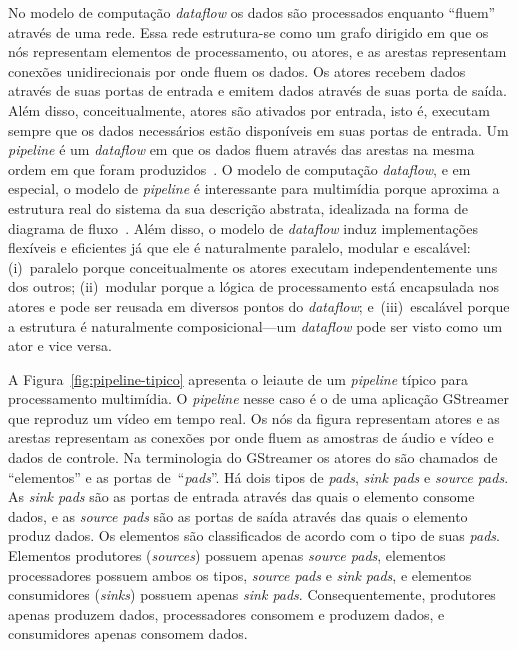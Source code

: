 \documentclass{SBCbookchapter}
\def\en#1{\foreignlanguage{english}{\emph{#1}}}
\begin{document}
No modelo de computação \en{dataflow} os dados são processados enquanto
``fluem'' através de uma rede.  Essa rede estrutura-se como um grafo
dirigido em que os nós representam elementos de processamento, ou atores, e
as arestas representam conexões unidirecionais por onde fluem os dados.  Os
atores recebem dados através de suas portas de entrada e emitem dados
através de suas porta de saída.  Além disso, conceitualmente, atores são
ativados por entrada, isto é, executam sempre que os dados necessários estão
disponíveis em suas portas de entrada.  Um \en{pipeline} é um \en{dataflow}
em que os dados fluem através das arestas na mesma ordem em que foram
produzidos~\cite{Kahn-G-1977,Lee-E-A-1995}.  O modelo de computação
\en{dataflow}, e em especial, o modelo de \en{pipeline} é interessante para
multimídia porque aproxima a estrutura real do sistema da sua descrição
abstrata, idealizada na forma de diagrama de fluxo~\cite{Yviquel-H-2014}.
Além disso, o modelo de \en{dataflow} induz implementações flexíveis e
eficientes já que ele é naturalmente paralelo, modular e escalável:
(i)~paralelo porque conceitualmente os atores executam independentemente uns
dos outros; (ii)~modular porque a lógica de processamento está encapsulada
nos atores e pode ser reusada em diversos pontos do \en{dataflow};
e~(iii)~escalável porque a estrutura é naturalmente composicional---um
\en{dataflow} pode ser visto como um ator e vice versa.

A Figura~\ref{fig:pipeline-tipico} apresenta o leiaute de um \en{pipeline}
típico para processamento multimídia.  O \en{pipeline} nesse caso é o de uma
aplicação GStreamer que reproduz um vídeo em tempo real.  Os nós da figura
representam atores e as arestas representam as conexões por onde fluem as
amostras de áudio e vídeo e dados de controle.  Na terminologia do GStreamer
os atores do são chamados de ``elementos'' e as portas de~``\en{pads}''.  Há
dois tipos de \en{pads}, \en{sink pads} e \en{source pads}.  As \en{sink
  pads} são as portas de entrada através das quais o elemento consome dados,
e as \en{source pads} são as portas de saída através das quais o elemento
produz dados.  Os elementos são classificados de acordo com o tipo de suas
\en{pads}.  Elementos produtores (\en{sources}) possuem apenas \en{source
  pads}, elementos processadores possuem ambos os tipos, \en{source pads} e
\en{sink pads}, e elementos consumidores (\en{sinks}) possuem apenas
\en{sink pads}.  Consequentemente, produtores apenas produzem dados,
processadores consomem e produzem dados, e consumidores apenas consomem
dados.
\end{document}
